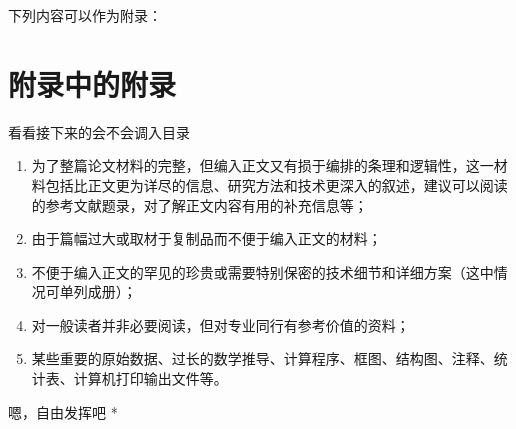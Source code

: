 \appendix

下列内容可以作为附录：

\section{附录中的附录}
看看接下来的会不会调入目录

\begin{enumerate}[label=\arabic*)]
\item 为了整篇论文材料的完整，但编入正文又有损于编排的条理和逻辑性，这一材料包括比正文更为详尽的信息、研究方法和技术更深入的叙述，建议可以阅读的参考文献题录，对了解正文内容有用的补充信息等；
\item 由于篇幅过大或取材于复制品而不便于编入正文的材料；
\item 不便于编入正文的罕见的珍贵或需要特别保密的技术细节和详细方案（这中情况可单列成册）；
\item 对一般读者并非必要阅读，但对专业同行有参考价值的资料；
\item 某些重要的原始数据、过长的数学推导、计算程序、框图、结构图、注释、统计表、计算机打印输出文件等。
\end{enumerate}

\par * 嗯，自由发挥吧 * \par
